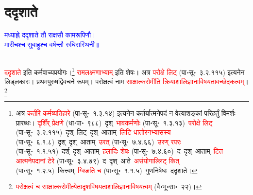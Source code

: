 \section[ददृशाते]{ददृशाते}
\centering\textcolor{blue}{मध्याह्ने ददृशाते तौ राक्षसौ कामरूपिणौ।\nopagebreak\\
मारीचश्च सुबाहुश्च वर्षन्तौ रुधिरास्थिनी॥}\nopagebreak\\
\\
\fontsize{14}{21}\selectfont\begin{sloppypar}\justifying\noindent\hspace{10mm} \textcolor{red}{ददृशाते} इति कर्म\-वाच्य\-प्रयोगः।\footnote{अत्र \textcolor{red}{कर्तरि कर्म\-व्यतिहारे} (पा॰सू॰~१.३.१४) इत्यनेन कर्तर्यात्मनेपदं न वेत्याशङ्कां परिहर्तुं विमर्शः प्रारब्धः। \textcolor{red}{दृशिँर् प्रेक्षणे} (धा॰पा॰~९८८)~\arrow दृश्~\arrow \textcolor{red}{भावकर्मणोः} (पा॰सू॰~१.३.१३)~\arrow \textcolor{red}{परोक्षे लिट्} (पा॰सू॰~३.२.११५)~\arrow दृश्~लिट्~\arrow दृश्~आताम्~\arrow \textcolor{red}{लिटि धातोरनभ्यासस्य} (पा॰सू॰~६.१.८)~\arrow दृश्~दृश्~आताम्~\arrow \textcolor{red}{उरत्‌} (पा॰सू॰~७.४.६६)~\arrow \textcolor{red}{उरण् रपरः} (पा॰सू॰~१.१.५१)~\arrow दर्श्~दृश्~आताम्~\arrow \textcolor{red}{हलादिः शेषः} (पा॰सू॰~७.४.६०)~\arrow द~दृश्~आताम्~\arrow \textcolor{red}{टित आत्मनेपदानां टेरे} (पा॰सू॰~३.४.७९)~\arrow द~दृश्~आते~\arrow \textcolor{red}{असंयोगाल्लिट् कित्} (पा॰सू॰~१.२.५)~\arrow कित्त्वम्~\arrow \textcolor{red}{ग्क्ङिति च} (पा॰सू॰~१.१.५)~\arrow गुणनिषेधः~\arrow ददृशाते।} \textcolor{red}{राम\-लक्ष्मणाभ्याम्} इति शेषः। अत्र \textcolor{red}{परोक्षे लिट्} (पा॰सू॰~३.२.११५) इत्यनेन लिड्लकारः। प्रथम\-पुरुष\-द्वि\-वचने रूपम्। परोक्षत्वं नाम \textcolor{red}{साक्षात्करोमीति क्रियाशालि\-ज्ञानाविषयतावच्छेदकत्वम्}।\footnote{\textcolor{red}{परोक्षत्वं च साक्षात्करोमीत्येतादृश\-विषयता\-शालि\-ज्ञानाविषयत्वम्} (वै॰भू॰सा॰~२२)।}\end{sloppypar}
